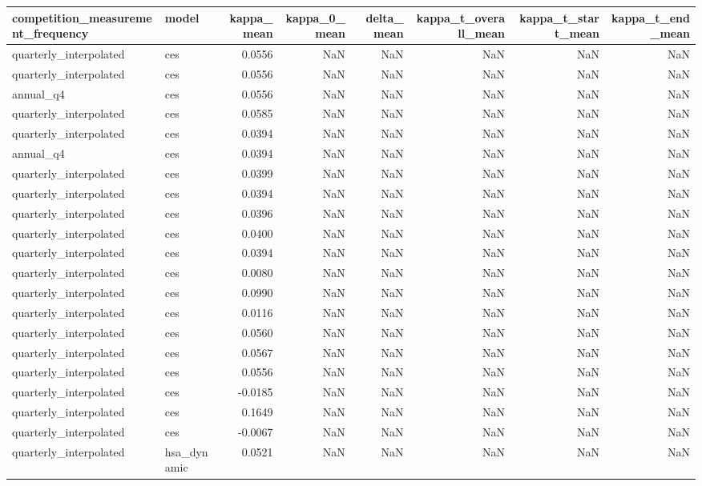 \begin{tabular}{llrrrrrr}
\toprule
competition\_measurement\_frequency & model & kappa\_mean & kappa\_0\_mean & delta\_mean & kappa\_t\_overall\_mean & kappa\_t\_start\_mean & kappa\_t\_end\_mean \\
\midrule
quarterly\_interpolated & ces & 0.0556 & NaN & NaN & NaN & NaN & NaN \\
quarterly\_interpolated & ces & 0.0556 & NaN & NaN & NaN & NaN & NaN \\
annual\_q4 & ces & 0.0556 & NaN & NaN & NaN & NaN & NaN \\
quarterly\_interpolated & ces & 0.0585 & NaN & NaN & NaN & NaN & NaN \\
quarterly\_interpolated & ces & 0.0394 & NaN & NaN & NaN & NaN & NaN \\
annual\_q4 & ces & 0.0394 & NaN & NaN & NaN & NaN & NaN \\
quarterly\_interpolated & ces & 0.0399 & NaN & NaN & NaN & NaN & NaN \\
quarterly\_interpolated & ces & 0.0394 & NaN & NaN & NaN & NaN & NaN \\
quarterly\_interpolated & ces & 0.0396 & NaN & NaN & NaN & NaN & NaN \\
quarterly\_interpolated & ces & 0.0400 & NaN & NaN & NaN & NaN & NaN \\
quarterly\_interpolated & ces & 0.0394 & NaN & NaN & NaN & NaN & NaN \\
quarterly\_interpolated & ces & 0.0080 & NaN & NaN & NaN & NaN & NaN \\
quarterly\_interpolated & ces & 0.0990 & NaN & NaN & NaN & NaN & NaN \\
quarterly\_interpolated & ces & 0.0116 & NaN & NaN & NaN & NaN & NaN \\
quarterly\_interpolated & ces & 0.0560 & NaN & NaN & NaN & NaN & NaN \\
quarterly\_interpolated & ces & 0.0567 & NaN & NaN & NaN & NaN & NaN \\
quarterly\_interpolated & ces & 0.0556 & NaN & NaN & NaN & NaN & NaN \\
quarterly\_interpolated & ces & -0.0185 & NaN & NaN & NaN & NaN & NaN \\
quarterly\_interpolated & ces & 0.1649 & NaN & NaN & NaN & NaN & NaN \\
quarterly\_interpolated & ces & -0.0067 & NaN & NaN & NaN & NaN & NaN \\
quarterly\_interpolated & hsa\_dynamic & 0.0521 & NaN & NaN & NaN & NaN & NaN \\

\end{tabular}
